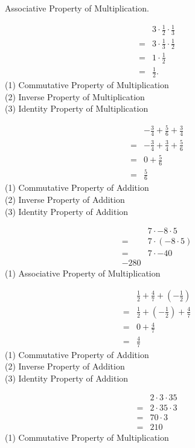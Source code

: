 \documentclass[12pt]{article}
\newenvironment{problem}[2][Problem]{\begin{trivlist}
\item[\hskip \labelsep {\bfseries #1}\hskip \labelsep {\bfseries #2.}]}{\end{trivlist}}
\begin{document}
\begin{problem}{26}
Associative Property of Multiplication.
\end{problem}

\begin{problem}{28}
\begin{align}
    &3 \cdot \frac{1}{2} \cdot \frac{1}{3} \nonumber\\
    = &3 \cdot \frac{1}{3} \cdot \frac{1}{2} \\
    = &1 \cdot \frac{1}{2} \\
    = &\boxed{\frac{1}{2}.}
\end{align}
(1) Commutative Property of Multiplication \\
(2) Inverse Property of Multiplication \\
(3) Identity Property of Multiplication
\end{problem}

\begin{problem}{30}
\setcounter{equation}{0}
\begin{align}
    &-\frac{3}{4} + \frac{5}{6} + \frac{3}{4}\nonumber \\
    = & -\frac{3}{4} + \frac{3}{4} + \frac{5}{6} \\
    = & 0 + \frac{5}{6} \\
    = & \frac{5}{6}
\end{align}
(1) Commutative Property of Addition \\
(2) Inverse Property of Addition \\
(3) Identity Property of Addition
\end{problem}

\begin{problem}{32}
\setcounter{equation}{0}
\begin{align}
    &7 \cdot -8 \cdot 5 \nonumber \\
    = &7 \cdot (-8 \cdot 5) \\
    = &7 \cdot -40 \nonumber \\ 
    \boxed{-280} \nonumber
\end{align}
(1) Associative Property of Multiplication
\end{problem}

\begin{problem}{34}
\setcounter{equation}{0}
\begin{align}
    &\frac{1}{2} + \frac{4}{7} + (-\frac{1}{2})\nonumber \\
    = &\frac{1}{2} + (-\frac{1}{2}) + \frac{4}{7} \\
    = &0 + \frac{4}{7} \\
    = &\frac{4}{7}
\end{align}
(1) Commutative Property of Addition \\
(2) Inverse Property of Addition \\
(3) Identity Property of Addition
\end{problem}

\begin{problem}{36}
\setcounter{equation}{0}
\begin{align}
    &2 \cdot 3 \cdot 35 \nonumber \\
    = &2 \cdot 35 \cdot 3 \\
    = &70 \cdot 3 \nonumber \\
    = &210 \nonumber
\end{align}
(1) Commutative Property of Multiplication
\end{problem}
\end{document}
